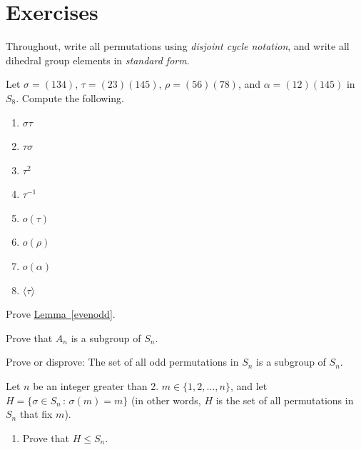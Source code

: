 \documentclass[10pt,openany,oneside]{book}
\theoremstyle{plain}
\theoremstyle{definition}
\theoremstyle{definition}
\theoremstyle{definition}
\theoremstyle{definition}
\numberwithin{equation}{section}
\begin{document}
\section[{Exercises}]{Exercises}\label{exercises-7}
Throughout, write all permutations using \emph{disjoint cycle notation}, and write all dihedral group elements in \emph{standard form}.%
\begin{exerciselist}
\item[1.]\hypertarget{exercise-41}{}Let \(\sigma=(134)\), \(\tau=(23)(145)\), \(\rho=(56)(78)\), and \(\alpha=(12)(145)\) in \(S_8\). Compute the following. \leavevmode%
\begin{multicols}{4}
\begin{enumerate}[label=(\alph*)]
\item\hypertarget{li-361}{}\(\sigma \tau\)%
\item\hypertarget{li-362}{}\(\tau \sigma\)%
\item\hypertarget{li-363}{}\(\tau^2\)%
\item\hypertarget{li-364}{}\(\tau^{-1}\)%
\item\hypertarget{li-365}{}\(o(\tau)\)%
\item\hypertarget{li-366}{}\(o(\rho)\)%
\item\hypertarget{li-367}{}\(o(\alpha)\)%
\item\hypertarget{li-368}{}\(\langle \tau\rangle\)%
\end{enumerate}
\end{multicols}
%
\par\smallskip
\item[2.]\hypertarget{exercise-42}{}Prove \hyperref[evenodd]{Lemma~\ref{evenodd}}.%
\par\smallskip
\item[3.]\hypertarget{exercise-43}{}Prove that \(A_n\) is a subgroup of \(S_n\).%
\par\smallskip
\item[4.]\hypertarget{exercise-44}{}Prove or disprove: The set of all odd permutations in \(S_n\) is a subgroup of \(S_n\).%
\par\smallskip
\item[5.]\hypertarget{exercise-45}{}Let \(n\) be an integer greater than 2. \(m \in \{1,2,\ldots,n\}\), and let \(H=\{\sigma\in S_n\,:\,\sigma(m)=m\}\) (in other words, \(H\) is the set of all permutations in \(S_n\) that fix \(m\)). \leavevmode%
\begin{enumerate}[label=(\alph*)]
\item\hypertarget{li-377}{}Prove that \(H\leq S_n\).%

\end{enumerate}
\end{exerciselist}
\end{document}
